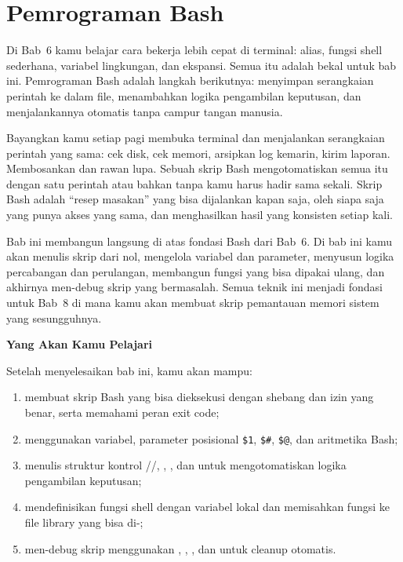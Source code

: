 
\chapter{Pemrograman Bash}
\label{ch:bash-programming}


Di Bab~6 kamu belajar cara bekerja lebih cepat di terminal: alias,
fungsi shell sederhana, variabel lingkungan, dan ekspansi. Semua itu
adalah bekal untuk bab ini. Pemrograman Bash adalah langkah berikutnya:
menyimpan serangkaian perintah ke dalam file, menambahkan logika
pengambilan keputusan, dan menjalankannya otomatis tanpa campur tangan
manusia.

Bayangkan kamu setiap pagi membuka terminal dan menjalankan serangkaian
perintah yang sama: cek disk, cek memori, arsipkan log kemarin, kirim
laporan. Membosankan dan rawan lupa. Sebuah skrip Bash mengotomatiskan
semua itu dengan satu perintah atau bahkan tanpa kamu harus hadir sama
sekali. Skrip Bash adalah ``resep masakan'' yang bisa dijalankan
kapan saja, oleh siapa saja yang punya akses yang sama, dan menghasilkan
hasil yang konsisten setiap kali.

Bab ini membangun langsung di atas fondasi Bash dari Bab~6.
Di bab ini kamu akan menulis skrip dari nol, mengelola variabel dan
parameter, menyusun logika percabangan dan perulangan, membangun fungsi
yang bisa dipakai ulang, dan akhirnya men-debug skrip yang bermasalah.
Semua teknik ini menjadi fondasi untuk Bab~8 di mana kamu akan membuat
skrip pemantauan memori sistem yang sesungguhnya.

\textbf{Yang Akan Kamu Pelajari}

Setelah menyelesaikan bab ini, kamu akan mampu:

\begin{enumerate}
    \item membuat skrip Bash yang bisa dieksekusi dengan shebang dan izin
          yang benar, serta memahami peran exit code;
    \item menggunakan variabel, parameter posisional \texttt{\$1},
          \texttt{\$\#}, \texttt{\$@}, dan aritmetika Bash;
    \item menulis struktur kontrol //,
          , , dan  untuk mengotomatiskan
          logika pengambilan keputusan;
    \item mendefinisikan fungsi shell dengan variabel lokal dan memisahkan
          fungsi ke file library yang bisa di-;
    \item men-debug skrip menggunakan , ,
          , dan  untuk cleanup otomatis.
\end{enumerate}

